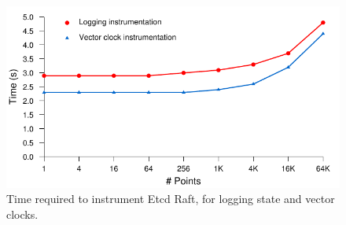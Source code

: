 \begin{figure}[h]
    \includegraphics[width=\linewidth]{fig/raft-performance-plot}
  \caption{Time required to instrument Etcd Raft, for logging state
    and vector clocks.}
    \label{fig:inst-perf}
\end{figure}


  

